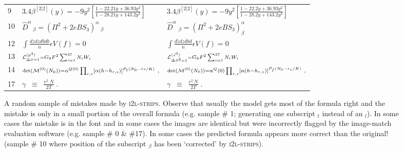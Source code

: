 \documentclass{article}
\begin{document}
\begin{figure*}
\begin{tabular}{lll}
\scriptsize{9} & $\scriptstyle{3 . 4 \beta ^ { [ 2 | 2 ] } ( y ) = - 9 y ^ { 2 } \left[ \frac { 1 - 2 2 . 2 1 y + 3 6 . 9 3 y ^ { 2 } } { 1 - 2 8 . 2 1 y + 1 4 3 . 2 y ^ { 2 } } \right] }$ & $\scriptstyle{3 . 4 \beta ^ { [ 2 | 2 ] } ( y ) = - 9 y ^ { 2 } \left[ \frac { 1 - 2 2 . 2 y + 3 6 . 9 3 y ^ { 2 } } { 1 - 2 8 . 2 y + 1 4 3 . 2 y ^ { 2 } } \right] }$ \\
\scriptsize{10} & $\scriptstyle{\widehat { D } ^ { \alpha } \, _ { \beta } = \left( \Pi ^ { 2 } + 2 e B S _ { 3 } \right) ^ { \alpha } \, _ { \beta } }$ & $\scriptstyle{\widehat { D } ^ { \alpha } \; _ { \beta } = \left( \Pi ^ { 2 } + 2 e B S _ { 3 } \right) ^ { \alpha } _ { \beta } }$ \\
\scriptsize{12} & $\scriptstyle{\int \frac { d \overline { { z } } d z d \overline { { b } } d b } { n } \epsilon V ( f ) = 0 }$ & $\scriptstyle{\int \frac { d \tilde { z } d z \bar { d } b d } { n } \epsilon V ( f ) = 0 }$ \\
\scriptsize{13} & $\scriptstyle{{ \cal L } _ { \Delta S = 1 } ^ { ( p ^ { 4 } ) } = G _ { 8 } F ^ { 2 } \sum _ { i = 1 } ^ { 3 7 } N _ { i } W _ { i } }$ & $\scriptstyle{{ \cal L } _ { \Delta S ^ { 2 } = 1 } ^ { ( s ^ { 0 } ) } = G _ { 8 } F ^ { 2 } \sum _ { i = 1 } ^ { 3 7 } N _ { i } W _ { i } }$ \\
\scriptsize{14} & $\scriptstyle{\operatorname* { d e t } ( { \cal M } ^ { ( 0 ) } ( N _ { 0 } ) ) = \alpha ^ { Q ( 0 ) } \prod _ { r , s } [ \alpha ( h - h _ { r , s } ) ] ^ { P _ { \ell } ( N _ { 0 } - r s / K ) } { } ~ , }$ & $\scriptstyle{\operatorname* { d e t } ( { \cal M } ^ { ( 0 ) } ( N _ { 0 } ) ) = \alpha ^ { Q } ( 0 ) \prod _ { r , s } [ \alpha ( h - h _ { r , s } ) ] ^ { P _ { f } ( N _ { 0 } - r _ { s } / K ) } \ , }$ \\
\scriptsize{17} & $\scriptstyle{\gamma \; \; \equiv \; \; \frac { e ^ { 2 } \; N } { 2 T } \; . }$ & $\scriptstyle{\gamma \; \; \equiv \; \; \frac { e ^ { 2 } \, N } { 2 T } \; . }$ \\
 	\end{tabular}
	\centering
	\caption[Random Sample of Mistakes]{A random sample of mistakes made by \textsc{i2l-strips}. Observe that usually the model gets most of the formula right and the mistake is only in a small portion of the overall formula (e.g. sample \# 1; generating one subscript $_t$ instead of an $_l$). In some cases the mistake is in the font and in some cases the images are identical but were incorrectly flagged by the image-match evaluation software (e.g. sample \# 0 \& \#17). In some cases the predicted formula appears more correct than the original! (sample \# 10 where position of the subscript $_{\beta}$ has been `corrected' by \textsc{i2l-strips}).
}
	\label{fig-bad-preds}
\end{figure*}
\end{document}
